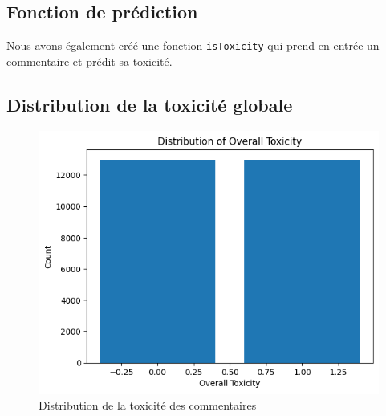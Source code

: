 \subsection{Fonction de prédiction}

Nous avons également créé une fonction \texttt{isToxicity} qui prend en entrée un commentaire et prédit sa toxicité.

\subsection{Distribution de la toxicité globale}

\begin{figure}[h]
    \centering
    \includegraphics[width=.47\linewidth]{figures/distribution-toxicity-naive_bayes.png}
    \caption{Distribution de la toxicité des commentaires}
\end{figure}